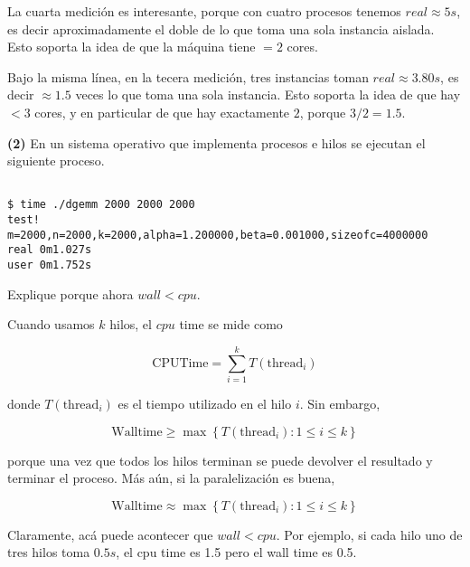 \documentclass[12pt]{article}
\theoremstyle{definition}
\begin{document}
La cuarta medición es interesante, porque con cuatro procesos tenemos $real
\approx 5s$, es decir aproximadamente el doble de lo que toma una sola instancia
aislada. Esto soporta la idea de que la máquina tiene $=2$ cores.

Bajo la misma línea, en la tecera medición, tres instancias toman $real \approx
3.80s$, es decir $\approx 1.5$ veces lo que toma una sola instancia. Esto
soporta la idea de que hay $< 3$ cores, y en particular de que hay exactamente
$2$, porque $3 / 2 = 1.5$.

\pagebreak 

\begin{shaded}
    \textbf{(2)} En un sistema operativo que implementa procesos e hilos se ejecutan el siguiente
proceso. 

\begin{verbatim}
    
$ time ./dgemm 2000 2000 2000
test!
m=2000,n=2000,k=2000,alpha=1.200000,beta=0.001000,sizeofc=4000000
real 0m1.027s
user 0m1.752s
\end{verbatim}

Explique porque ahora $wall < cpu$.


\end{shaded}

Cuando usamos $k$ hilos, el $cpu$ time se mide como 

\begin{equation*}
    \text{CPUTime} = \sum_{i=1}^k T(\text{thread}_i)
\end{equation*}

donde $T(\text{thread}_i)$ es el tiempo utilizado en el hilo $i$. Sin embargo,

\begin{equation*}
    \text{Walltime} \geq \max \left\{ T(\text{thread}_i) : 1 \leq i \leq k \right\} 
\end{equation*}

porque una vez que todos los hilos terminan se puede devolver el resultado y
terminar el proceso. Más aún, si la paralelización es buena, 

\begin{equation*}
    \text{Walltime} \approx \max \left\{ T(\text{thread}_i) : 1 \leq i \leq k \right\} 
\end{equation*}

Claramente, acá puede acontecer que $wall < cpu$. Por ejemplo, si cada hilo uno
de tres hilos toma $0.5s$, el cpu time es 1.5 pero el wall time es 0.5.
\end{document}
